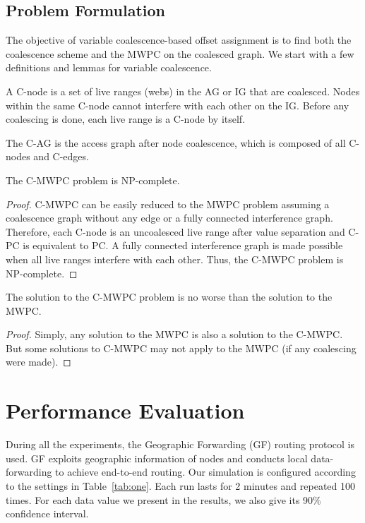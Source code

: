 \subsection{Problem Formulation}

The objective of variable coalescence-based offset assignment is to find
both the coalescence scheme and the MWPC on the coalesced graph. We start
with a few definitions and lemmas for variable coalescence.

\begin{definition}A C-node is a set of
live ranges (webs) in the AG or IG that are coalesced. Nodes within the same
C-node cannot interfere with each other on the IG. Before any coalescing is
done, each live range is a C-node by itself.
\end{definition}

\begin{definition}The C-AG is the access
graph after node coalescence, which is composed of all C-nodes and C-edges.
\end{definition}

\begin{lemma}
The C-MWPC problem is NP-complete.
\end{lemma}
\begin{proof} C-MWPC can be easily reduced to the MWPC problem assuming a
coalescence graph without any edge or a fully connected interference graph.
Therefore, each C-node is an uncoalesced live range after value separation
and C-PC is equivalent to PC. A fully connected interference graph is made
possible when all live ranges interfere with each other. Thus, the C-MWPC
problem is NP-complete.
\end{proof}

\begin{lemma}The solution to the C-MWPC problem is no
worse than the solution to the MWPC.
\end{lemma}
\begin{proof}
Simply, any solution to the MWPC is also a solution to the
C-MWPC. But some solutions to C-MWPC may not apply to the MWPC (if any
coalescing were made).
\end{proof}

\section{Performance Evaluation}

During all the experiments, the Geographic Forwarding (GF)
\cite{Akyildiz-01} routing protocol is used. GF exploits geographic
information of nodes and conducts local data-forwarding to achieve
end-to-end routing. Our simulation is configured according to the
settings in Table~\ref{tab:one}. Each run lasts for 2 minutes and
repeated 100 times. For each data value we present in the results, we
also give its 90\% confidence interval.

